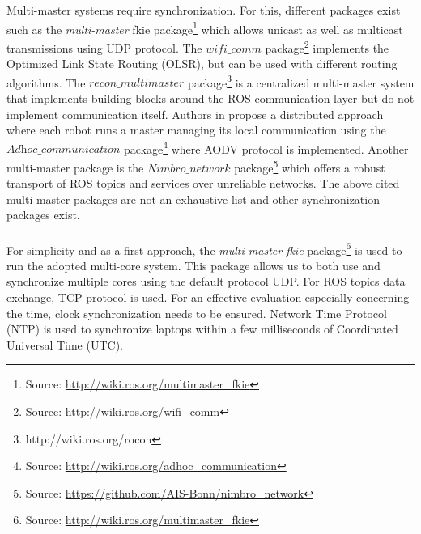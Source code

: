 \documentclass[11pt,openany]{book}
\begin{document}
\begin{algorimth}[H]
Multi-master systems require synchronization. For this, diﬀerent packages exist such as the \textit{multi-master} fkie package\footnote{Source: \url{http://wiki.ros.org/multimaster_fkie}} which allows unicast as well as multicast transmissions using UDP protocol. The $\textit{wifi\_comm}$ package\footnote{Source: \url{http://wiki.ros.org/wifi_comm}} implements the Optimized Link State Routing (OLSR), but can be used with diﬀerent routing algorithms. The $\textit{recon\_multimaster}$ package\footnote{http://wiki.ros.org/rocon} is a centralized multi-master system that implements building blocks around the ROS communication layer but do not implement communication itself. Authors in \cite{andre2014coordinated} propose a distributed approach where each robot runs a master managing its local communication using the $\textit{Adhoc\_communication}$ package\footnote{Source: \url{http://wiki.ros.org/adhoc_communication}} where AODV protocol is implemented. Another multi-master package is the $\textit{Nimbro\_network}$ package\footnote{Source: \url{https://github.com/AIS-Bonn/nimbro_network}} which oﬀers a robust transport of ROS topics and services over unreliable networks. The above cited multi-master packages are not an exhaustive list and other synchronization packages exist.\\\\
For simplicity and as a ﬁrst approach, the \textit{multi-master fkie} package\footnote{Source: \url{http://wiki.ros.org/multimaster_fkie}} is used to run the adopted multi-core system. This package allows us to both use and synchronize multiple cores using the default protocol UDP. For ROS topics data exchange, TCP protocol is used. For an eﬀective evaluation especially concerning the time, clock synchronization needs to be ensured. Network Time Protocol (NTP) is used to synchronize laptops within a few milliseconds of Coordinated Universal Time (UTC).

\end{algorimth}
\end{document}
